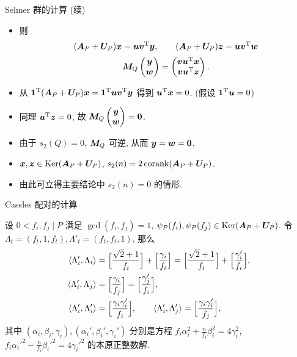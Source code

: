 \documentclass[handout,aspectratio=169]{ctexbeamer}
\renewcommand\aleg[2]{\Bigl[\dfrac{{#1}}{#2}\Bigr]}
\begin{document}
\begin{frame}{Selmer 群的计算 (续)}
	\begin{itemize}
		\item 
		则
		\[
			({\boldsymbol{A}}_P+{\boldsymbol{U}}_P){\boldsymbol{x}}={\boldsymbol{u}}{\boldsymbol{v}}^{\mathrm{T}}{\boldsymbol{y}},\qquad
			({\boldsymbol{A}}_P+{\boldsymbol{U}}_P){\boldsymbol{z}}={\boldsymbol{u}}{\boldsymbol{v}}^{\mathrm{T}}{\boldsymbol{w}}
		\]
		\[
			{\boldsymbol{M}}_Q\begin{pmatrix}
				{\boldsymbol{y}}\\{\boldsymbol{w}}
			\end{pmatrix}
			=\begin{pmatrix}
				{\boldsymbol{v}}{\boldsymbol{u}}^{\mathrm{T}}{\boldsymbol{x}}\\
				{\boldsymbol{v}}{\boldsymbol{u}}^{\mathrm{T}}{\boldsymbol{z}}
			\end{pmatrix}.
		\]
		\item 从 ${\bf1}^{\mathrm{T}}({\boldsymbol{A}}_P+{\boldsymbol{U}}_P){\boldsymbol{x}}={\bf1}^{\mathrm{T}}{\boldsymbol{u}}{\boldsymbol{v}}^{\mathrm{T}}{\boldsymbol{y}}$ 得到 ${\boldsymbol{u}}^{\mathrm{T}}{\boldsymbol{x}}=0$. \hfill (假设 ${\bf1}^{\mathrm{T}}{\boldsymbol{u}}=0$)
		\item 同理 ${\boldsymbol{u}}^{\mathrm{T}}{\boldsymbol{z}}=0$, 故 ${\boldsymbol{M}}_Q\begin{pmatrix}
				{\boldsymbol{y}}\\{\boldsymbol{w}}
			\end{pmatrix}={\bf0}$.
		\item 由于 $s_2(Q)=0$, ${\boldsymbol{M}}_Q$ 可逆, 从而 ${\boldsymbol{y}}={\boldsymbol{w}}={\bf0}$,
		\item ${\boldsymbol{x}},{\boldsymbol{z}}\in\operatorname{Ker}({\boldsymbol{A}}_P+{\boldsymbol{U}}_P)$, $s_2(n)=2\operatorname{corank}({\boldsymbol{A}}_P+{\boldsymbol{U}}_P)$.
		\item 由此可立得主要结论中 $s_2(n)=0$ 的情形.
	\end{itemize}
\end{frame}


\begin{frame}{Cassles 配对的计算}
	\onslide<+->
	\begin{proposition}
		设 $0<f_i,f_j\mid P$ 满足 $\gcd(f_i,f_j)=1$, $\psi_P(f_i),\psi_P(f_j)\in \operatorname{Ker}({\boldsymbol{A}}_P+{\boldsymbol{U}}_P)$.
		令 $\Lambda_t=(f_t,1,f_t), \Lambda'_t=(f_t,f_t,1)$,
		那么
		\begin{align*}
			\pair{\Lambda_i',\Lambda_i}&=\aleg{\sqrt2+1}{f_i}+\aleg{\gamma_i}{f_i}=\aleg{\sqrt2+1}{f_i}+\aleg{\gamma_i'}{f_i},\\
			\pair{\Lambda_i',\Lambda_j}&=\aleg{\gamma_i}{f_j}=\aleg{\gamma_j'}{f_i},\\
			\pair{\Lambda_i',\Lambda_i'}&=\aleg{\gamma_i\gamma_i'}{f_i},\qquad
			\pair{\Lambda_i',\Lambda_j'}=\aleg{\gamma_i\gamma_i'}{f_j},
		\end{align*}
		其中 $(\alpha_i,\beta_i,\gamma_i),(\alpha_i',\beta_i',\gamma_i')$ 分别是方程 $f_i\alpha_i^2+\frac n{f_i}\beta_i^2=4\gamma_i^2$, $f_i\alpha_i'^2-\frac n{f_i}\beta_i'^2=4\gamma_i'^2$ 的本原正整数解.
	\end{proposition}
\end{frame}
\end{document}
